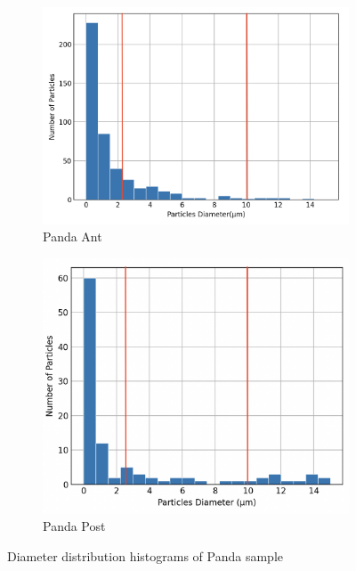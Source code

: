 \begin{figure}[H]
\centering
\begin{subfigure}{.5\textwidth}
  \centering
  \includegraphics[width=1\linewidth]{images/Panda_Ant_D.png}
  \caption{Panda Ant}
  \label{fig:pandaant}
\end{subfigure}%
\begin{subfigure}{.5\textwidth}
  \centering
  \includegraphics[width=0.85\linewidth]{images/Panda_Post_D.png}
  \caption{Panda Post}
  \label{fig:pandapost}
\end{subfigure}
\caption{Diameter distribution histograms of Panda sample}
\label{fig:1}
\end{figure}

